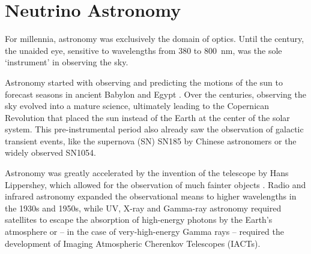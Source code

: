 \documentclass[
    a4paper, %
    fontsize=10pt, %
    twoside=false, %
    numbers=noenddot, %
    fontmethod=tex,
]{kaobook}
\begin{document}

\tableofcontents
\listoffigures

\let\cleardoublepage\bigskip
\let\clearpage\bigskip

\listoftables

\endgroup

\mainmatter
{}





\chapter{Neutrino Astronomy} \label{theory}

For millennia, astronomy was exclusively the domain of optics. Until the  century, the unaided eye, sensitive to wavelengths from \num{380} to \SI{800}{\nano\m}, was the sole `instrument'  in observing the sky.

Astronomy started with observing and predicting the motions of the sun to forecast seasons in ancient Babylon and Egypt . Over the centuries, observing the sky evolved into a mature science, ultimately leading to the Copernican Revolution that placed the sun instead of the Earth at the center of the solar system. This pre-instrumental period also already saw the observation of galactic transient events, like the supernova (SN) SN185 by Chinese astronomers or the widely observed SN1054.

Astronomy was greatly accelerated by the invention of the telescope by Hans Lippershey, which allowed for the observation of much fainter objects . Radio and infrared astronomy expanded the observational means to higher wavelengths in the 1930s and 1950s, while UV, X-ray and Gamma-ray astronomy required satellites to escape the absorption of high-energy photons by the Earth's atmosphere or -- in the case of very-high-energy Gamma rays -- required the development of Imaging Atmospheric Cherenkov Telescopes (IACTs).
\end{document}
